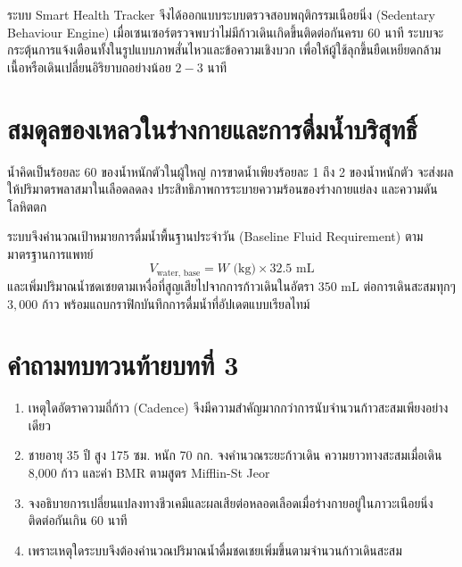 ระบบ Smart Health Tracker จึงได้ออกแบบระบบตรวจสอบพฤติกรรมเนือยนิ่ง (Sedentary Behaviour Engine) เมื่อเซนเซอร์ตรวจพบว่าไม่มีก้าวเดินเกิดขึ้นติดต่อกันครบ 60 นาที ระบบจะกระตุ้นการแจ้งเตือนทั้งในรูปแบบภาพสั่นไหวและข้อความเชิงบวก เพื่อให้ผู้ใช้ลุกขึ้นยืดเหยียดกล้ามเนื้อหรือเดินเปลี่ยนอิริยาบถอย่างน้อย $2 - 3$ นาที

\section{สมดุลของเหลวในร่างกายและการดื่มน้ำบริสุทธิ์}
น้ำคิดเป็นร้อยละ 60 ของน้ำหนักตัวในผู้ใหญ่ การขาดน้ำเพียงร้อยละ 1 ถึง 2 ของน้ำหนักตัว จะส่งผลให้ปริมาตรพลาสมาในเลือดลดลง ประสิทธิภาพการระบายความร้อนของร่างกายแย่ลง และความดันโลหิตตก

ระบบจึงคำนวณเป้าหมายการดื่มน้ำพื้นฐานประจำวัน (Baseline Fluid Requirement) ตามมาตรฐานการแพทย์
\begin{equation}
V_{\text{water, base}} = W\text{ (kg)} \times 32.5\text{ mL}
\end{equation}
และเพิ่มปริมาณน้ำชดเชยตามเหงื่อที่สูญเสียไปจากการก้าวเดินในอัตรา $350\text{ mL}$ ต่อการเดินสะสมทุกๆ $3{,}000$ ก้าว พร้อมแถบกราฟิกบันทึกการดื่มน้ำที่อัปเดตแบบเรียลไทม์

\section*{คำถามทบทวนท้ายบทที่ 3}
\begin{enumerate}
    \item เหตุใดอัตราความถี่ก้าว (Cadence) จึงมีความสำคัญมากกว่าการนับจำนวนก้าวสะสมเพียงอย่างเดียว
    \item ชายอายุ 35 ปี สูง 175 ซม. หนัก 70 กก. จงคำนวณระยะก้าวเดิน ความยาวทางสะสมเมื่อเดิน 8,000 ก้าว และค่า BMR ตามสูตร Mifflin-St Jeor
    \item จงอธิบายการเปลี่ยนแปลงทางชีวเคมีและผลเสียต่อหลอดเลือดเมื่อร่างกายอยู่ในภาวะเนือยนิ่งติดต่อกันเกิน 60 นาที
    \item เพราะเหตุใดระบบจึงต้องคำนวณปริมาณน้ำดื่มชดเชยเพิ่มขึ้นตามจำนวนก้าวเดินสะสม
\end{enumerate}
\clearpage
